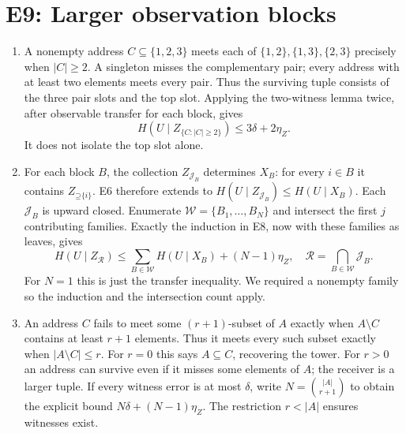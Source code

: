 \documentclass[11pt]{article}
\newcommand{\Up}{\mathord{\supseteq}}
\begin{document}
\section{E9: Larger observation blocks}
\label{sec:e9}
\begin{enumerate}[label=(\alph*)]
\item A nonempty address $C\subseteq\{1,2,3\}$ meets each of
$\{1,2\},\{1,3\},\{2,3\}$ precisely when $|C|\ge2$.
A singleton misses the complementary pair; every address with at least two
elements meets every pair. Thus the surviving tuple consists of the three
pair slots and the top slot. Applying the two-witness lemma twice, after
observable transfer for each block, gives
\[
 H(U\mid Z_{\{C:|C|\ge2\}})\le3\delta+2\eta_Z.
\]
It does not isolate the top slot alone.
\item For each block $B$, the collection $Z_{\mathcal{J}_B}$ determines
$X_B$: for every $i\in B$ it contains $Z_{\Up\{i\}}$. E6 therefore
extends to $H(U\mid Z_{\mathcal{J}_B})\le H(U\mid X_B)$.
Each $\mathcal{J}_B$ is upward closed. Enumerate
$\mathcal{W}=\{B_1,\ldots,B_N\}$ and intersect the first $j$ contributing
families. Exactly the induction in E8, now with these families as leaves,
gives
\[
 H(U\mid Z_{\mathcal{R}})\le
 \sum_{B\in\mathcal{W}}H(U\mid X_B)+(N-1)\eta_Z,
 \quad \mathcal{R}=\bigcap_{B\in\mathcal{W}}\mathcal{J}_B.
\]
For $N=1$ this is just the transfer inequality. We required a nonempty family
so the induction and the intersection count apply.
\item An address $C$ fails to meet some $(r+1)$-subset of $A$ exactly when
$A\setminus C$ contains at least $r+1$ elements. Thus it meets every such
subset exactly when $|A\setminus C|\le r$. For $r=0$ this says
$A\subseteq C$, recovering the tower. For $r>0$ an address can survive even
if it misses some elements of $A$; the receiver is a larger tuple.
If every witness error is at most $\delta$, write
$N=\binom{|A|}{r+1}$ to obtain the explicit bound
$N\delta+(N-1)\eta_Z$. The restriction $r<|A|$ ensures witnesses exist.
\end{enumerate}
\end{document}
